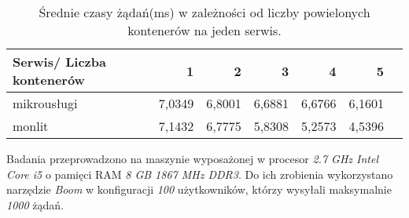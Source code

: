 \begin{table}[h!]
\centering
\caption{Średnie czasy żądań(ms) w zależności od liczby powielonych kontenerów na jeden serwis.}
\begin{tabular}{|l|r|r|r|r|r|r|}
\hline
\textbf{Serwis/ Liczba kontenerów} &	\textbf{1}	    & \textbf{2}	        & \textbf{3}	        & \textbf{4}            & \textbf{5} \\ \hline
mikrousługi	      & 7,0349	& 6,8001	& 6,6881	& 6,6766	    & 6,1601 \\ \hline
monlit	          & 7,1432	& 6,7775	& 5,8308	& 5,2573	    & 4,5396 \\ \hline
\end{tabular}
\end{table}
Badania przeprowadzono na maszynie wyposażonej w procesor \textit{2.7 GHz Intel Core i5} o pamięci RAM \textit{8 GB 1867 MHz DDR3}. Do ich zrobienia wykorzystano narzędzie \textit{Boom} w konfiguracji \textit{100} użytkowników, którzy wysyłali maksymalnie \textit{1000} żądań.
 